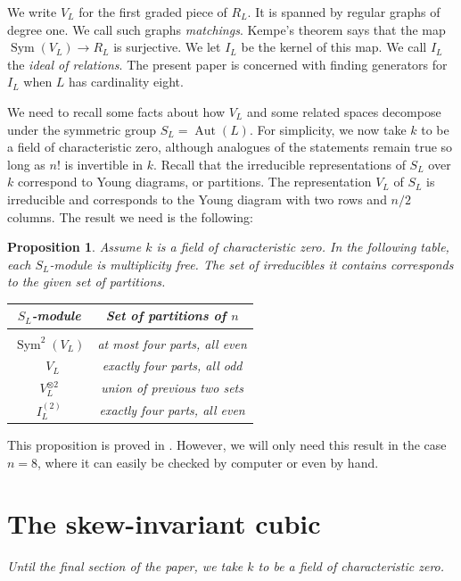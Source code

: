 \documentclass{amsart}
\newtheorem{proposition}[theorem]{Proposition}
\theoremstyle{definition}
\theoremstyle{remark}
\DeclareMathOperator{\Sym}{Sym}
\DeclareMathOperator{\bw}{{\bigwedge}^{\! 2}}
\DeclareMathOperator{\Aut}{Aut}
\begin{document}
We write $V_L$ for the first graded piece of $R_L$.  It is spanned by regular
graphs of degree one.  We call such graphs \emph{matchings}.  Kempe's theorem
says that the map $\Sym(V_L) \to R_L$ is surjective.  We let $I_L$ be the
kernel of this map.  We call $I_L$ the \emph{ideal of relations}.  The present
paper is concerned with finding generators for $I_L$ when $L$ has cardinality
eight.

We need to recall some facts about how $V_L$ and some related spaces decompose
under the symmetric group $S_L =\Aut(L)$.  For simplicity, we now take $k$ to be a
field of characteristic zero, although analogues of the statements remain true so
long as $n!$ is invertible in $k$.  Recall that the irreducible representations of
$S_L$ over $k$ correspond to Young diagrams, or partitions.  The representation
$V_L$ of $S_L$ is irreducible and corresponds to the Young diagram with two rows
and $n/2$ columns.  The result we need is the following:

\begin{proposition}
\label{prop:decomp}
Assume $k$ is a field of characteristic zero.  In the following table, each
$S_L$-module is multiplicity free.  The set of irreducibles it contains
corresponds to the given set of partitions.
\begin{center}
\rm
\begin{tabular}{c|c}
$S_L$-module & Set of partitions of $n$ \\[.5ex]
\hline \\[-2ex]
$\Sym^2(V_L)$ & at most four parts, all even \\[1ex]
$\bw{V_L}$ & exactly four parts, all odd \\[1ex]
$V_L^{\otimes 2}$ & union of previous two sets \\[1ex]
$I_L^{(2)}$ & exactly four parts, all even
\end{tabular}\end{center}
\end{proposition}

This proposition is proved in \cite{HMSV}.  However, we will only need this
result in the case $n=8$, where it can easily be checked by computer or even by
hand.


\section{The skew-invariant cubic}

\noindent
{\it Until the final section of the paper, we take $k$ to be a field of
characteristic zero.}
\end{document}
